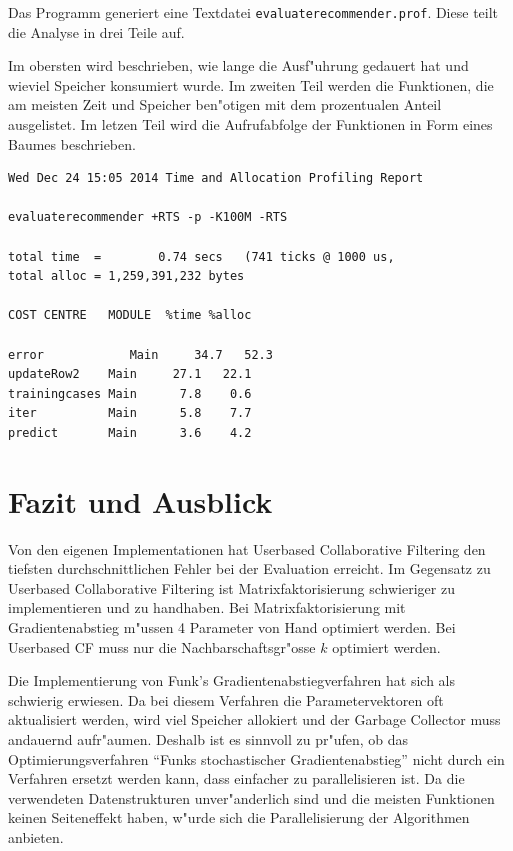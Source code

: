 \documentclass[a4paper, 12pt]{article}
\begin{document}
Das Programm generiert eine Textdatei \verb|evaluaterecommender.prof|. Diese teilt die Analyse in drei Teile auf.

Im obersten wird beschrieben, wie lange die Ausf"uhrung gedauert hat und wieviel Speicher konsumiert wurde. Im zweiten Teil werden die Funktionen, die am meisten Zeit und Speicher ben"otigen mit dem prozentualen Anteil ausgelistet. Im letzen Teil wird die Aufrufabfolge der Funktionen in Form eines Baumes beschrieben.

\begin{verbatim}
Wed Dec 24 15:05 2014 Time and Allocation Profiling Report 

evaluaterecommender +RTS -p -K100M -RTS

total time  =        0.74 secs   (741 ticks @ 1000 us,
total alloc = 1,259,391,232 bytes 

COST CENTRE   MODULE  %time %alloc

error            Main     34.7   52.3
updateRow2    Main     27.1   22.1
trainingcases Main      7.8    0.6
iter          Main      5.8    7.7
predict       Main      3.6    4.2

\end{verbatim}

\section{Fazit und Ausblick}
\label{sec:fazit}

Von den eigenen Implementationen hat Userbased Collaborative Filtering den tiefsten durchschnittlichen Fehler bei der Evaluation erreicht. Im Gegensatz zu Userbased Collaborative Filtering ist Matrixfaktorisierung schwieriger zu implementieren und zu handhaben. Bei Matrixfaktorisierung mit Gradientenabstieg m"ussen 4 Parameter von Hand optimiert werden. Bei Userbased CF muss nur die Nachbarschaftsgr"osse $k$ optimiert werden.

Die Implementierung von Funk's Gradientenabstiegverfahren hat sich als schwierig erwiesen. Da bei diesem Verfahren die Parametervektoren oft aktualisiert werden, wird viel Speicher allokiert und der Garbage Collector muss andauernd aufr"aumen. Deshalb ist es sinnvoll zu pr"ufen, ob das Optimierungsverfahren ``Funks stochastischer Gradientenabstieg'' nicht durch ein Verfahren ersetzt werden kann, dass einfacher zu parallelisieren ist. Da die verwendeten Datenstrukturen unver"anderlich sind und die meisten Funktionen keinen Seiteneffekt haben, w"urde sich die Parallelisierung der Algorithmen anbieten.
\end{document}
